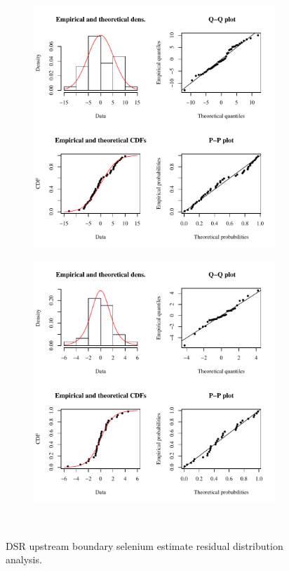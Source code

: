\subfiguremid
\begin{landscape}
	\begin{figure}
		\begin{subfigure}{0.7\textwidth}
			\centering
			\includegraphics[width=\tableCustomSize]{"Figures/Results_DSR/Stochastic/Conc Model res-fit BIG"}
		\end{subfigure}%
		\begin{subfigure}{0.7\textwidth}
			\centering
			\includegraphics[width=\tableCustomSize]{"Figures/Results_DSR/Stochastic/Conc Model res-fit WIL"}
		\end{subfigure}\\
		\caption{DSR upstream boundary selenium estimate residual distribution analysis.}
	\end{figure}
\end{landscape}

